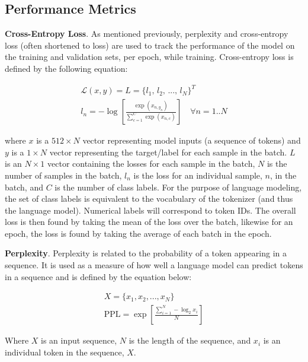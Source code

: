 \documentclass[12pt]{article}
\begin{document}
\subsection{Performance Metrics}\label{sec:performance_metrics}
\textbf{Cross-Entropy Loss}. As mentioned previously, perplexity and cross-entropy loss (often shortened to loss) are used to track the performance of
the model on the training and validation sets, per epoch, while training. Cross-entropy loss is defined by the following equation:

\begin{equation}\label{eq:cross_entropy_loss}
    \begin{gathered}
        \mathcal{L}(x, y) = L = \{\mbox{$l_1$, $l_2$, ..., $l_N$}\}^T\\
        l_n = -\log \left[\frac{\exp(x_{n,y_n})}{\sum_{c=1}^{C}\exp(x_{n,c})}\right] \quad \forall n=1..N
    \end{gathered}
\end{equation}

\noindent
where $x$ is a $512 \times N$ vector representing model inputs (a sequence of tokens) and $y$ is a $1 \times N$ vector representing the target/label
for each sample in the batch. $L$ is an $N \times 1$ vector containing the losses for each sample in the batch, $N$ is the number of samples in the
batch, $l_n$ is the loss for an individual sample, $n$, in the batch, and $C$ is the number of class labels. For the purpose of language modeling, the
set of class labels is equivalent to the vocabulary of the tokenizer (and thus the language model). Numerical labels will correspond to token IDs. The
overall loss is then found by taking the mean of the loss over the batch, likewise for an epoch, the loss is found by taking the average of each batch
in the epoch.

\textbf{Perplexity}. Perplexity is related to the probability of a token appearing in a sequence. It is used as a measure of how well a language model
can predict tokens in a sequence and is defined by the equation below:

\begin{equation}\label{eq:perplexity}
    \begin{gathered}
        X = \{x_1, x_2, ..., x_N\}\\
        \mbox{PPL} = \exp\left[\frac{\sum_{i=1}^N - \log_2 x_i}{N}\right]
    \end{gathered}
\end{equation}

\noindent
Where $X$ is an input sequence, $N$ is the length of the sequence, and $x_i$ is an individual token in the sequence, $X$.
\end{document}
